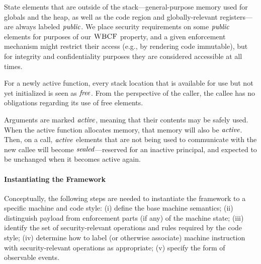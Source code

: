 \documentclass[10pt,conference]{ieeetran}%
\theoremstyle{definition}
\begin{document}
State elements that are outside of the stack---general-purpose memory used for
globals and the heap, as well as the code region and globally-relevant
registers---are always labeled \(\mathit{public}\). We place security requirements on some
\(\mathit{public}\) elements for purposes of our \(\textnormal{\sc WBCF}\) property, and a
given enforcement mechanism
might restrict their access (e.g., by rendering code immutable), but for integrity
and confidentiality purposes they are considered accessible at all times.

For a newly active function, every stack location that is available
for use but not yet initialized
is seen as \(\mathit{free}\). From the perspective of the caller, the callee has no obligations
regarding its use of free elements.

Arguments are marked \(\mathit{active}\), meaning that their contents may be safely used.
When the active function allocates memory, that memory will also be \(\mathit{active}\).
Then, on a call, \(\mathit{active}\) elements that are not being used to communicate with
the new callee will become \(\mathit{sealed}\)---reserved for an inactive principal,
and expected to be unchanged when it becomes active again.



\paragraph*{Instantiating the Framework}

Conceptually, the following steps are needed to instantiate the framework to a specific machine
and code style: (i) define the base machine semantics; (ii) distinguish payload
from enforcement parts (if any) of the machine state; (iii) identify the set of
security-relevant operations and rules required by the code style; (iv) determine
how to label (or otherwise associate) machine instruction with security-relevant
operations as appropriate; (v) specify the form of observable events.
\end{document}
